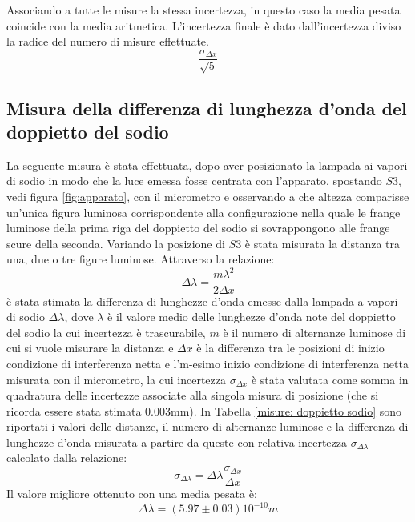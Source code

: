 \documentclass{article}
\begin{document}
    Associando a tutte le misure la stessa incertezza, in questo caso la media pesata coincide con la media aritmetica. L'incertezza finale è dato dall'incertezza diviso la radice del numero di misure effettuate.
    \[\frac{\sigma_{\Delta x}}{\sqrt{5}}\]
\subsection{Misura della differenza di lunghezza d'onda del doppietto del sodio}
    La seguente misura è stata effettuata, dopo aver posizionato la lampada ai vapori di sodio in modo che la luce emessa fosse centrata con l'apparato, spostando $S3$, vedi figura \ref{fig:apparato}, con il micrometro e osservando a che altezza comparisse un'unica figura luminosa corrispondente alla configurazione nella quale le frange luminose della prima riga del doppietto del sodio si sovrappongono alle frange scure della seconda. Variando la posizione di $S3$ è stata misurata la distanza tra una, due o tre figure luminose. 
    Attraverso la relazione:
        \[\Delta \lambda = \frac{m \lambda^2}{2\Delta x}\]
    è stata stimata la differenza di lunghezze d'onda emesse dalla lampada a vapori di sodio $\Delta \lambda$, dove $\lambda$ è il valore medio delle lunghezze d'onda note del doppietto del sodio la cui incertezza è trascurabile, $m$ è il numero di alternanze luminose di cui si vuole misurare la distanza e $\Delta x $ è la differenza tra le posizioni di inizio condizione di interferenza netta e l'm-esimo inizio condizione di interferenza netta misurata con il micrometro, la cui incertezza $\sigma_{\Delta x}$ è stata valutata come somma in quadratura delle incertezze associate alla singola misura di posizione (che si ricorda essere stata stimata $0.003$mm). In Tabella \ref{misure: doppietto sodio} sono riportati i valori delle distanze, il numero di alternanze luminose e la differenza di lunghezze d'onda misurata a partire da queste con relativa incertezza $\sigma_{\Delta\lambda}$ calcolato dalla relazione:
        \[\sigma_{\Delta\lambda}= \Delta\lambda \frac{\sigma_{\Delta x}}{\Delta x}\]
    Il valore migliore ottenuto con una media pesata è: 
        \[\Delta\lambda= (5.97 \pm 0.03)10^{-10} m\]
\end{document}
